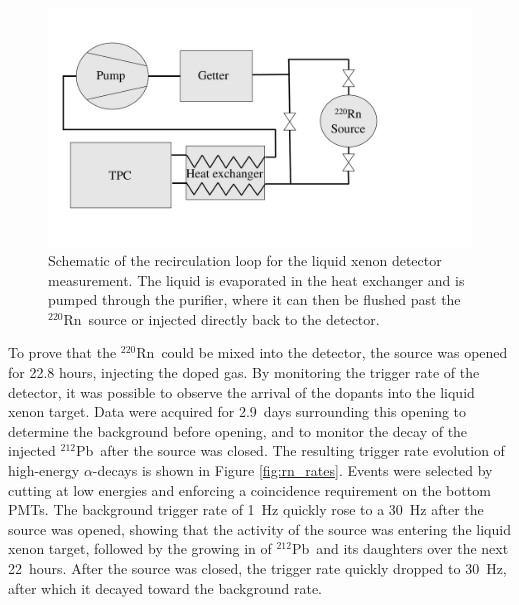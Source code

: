 \begin{figure}[htb]
\centering
    \includegraphics[trim = 0 0 0 0, clip = true,width = 0.8\columnwidth]{figures/rnsource/recirc_schematic.pdf}
    \caption{Schematic of the recirculation loop for the liquid xenon detector measurement. The liquid is evaporated in the heat exchanger and is pumped through the purifier, where it can then be flushed past the $^{220}$Rn~source or injected directly back to the detector.}\label{fig:rn_recirc}
\end{figure}

To prove that the $^{220}$Rn~could be mixed into the detector, the source was opened for 22.8 hours, injecting the doped gas. By monitoring the trigger rate of the detector, it was possible to observe the arrival of the dopants into the liquid xenon target. Data were acquired for 2.9~days surrounding this opening to determine the background before opening, and to monitor the decay of the injected $^{212}$Pb~after the source was closed. The resulting trigger rate evolution of high-energy $\alpha$-decays is shown in Figure \ref{fig:rn_rates}. Events were selected by cutting at low energies and enforcing a coincidence requirement on the bottom PMTs. The background trigger rate of 1~Hz quickly rose to a 30~Hz after the source was opened, showing that the activity of the source was entering the liquid xenon target, followed by the growing in of $^{212}$Pb~and its daughters over the next 22~hours. After the source was closed, the trigger rate quickly dropped to 30~Hz, after which it decayed toward the background rate.

